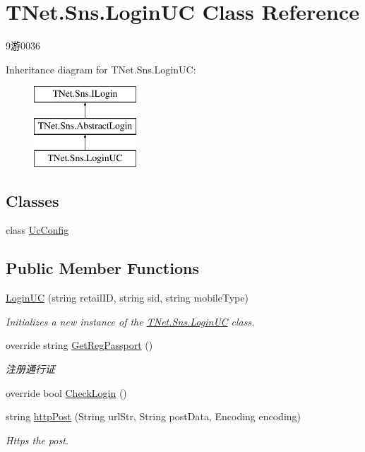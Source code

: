 \hypertarget{class_t_net_1_1_sns_1_1_login_u_c}{}\section{T\+Net.\+Sns.\+Login\+UC Class Reference}
\label{class_t_net_1_1_sns_1_1_login_u_c}


9游0036  


Inheritance diagram for T\+Net.\+Sns.\+Login\+UC\+:\begin{figure}[H]
\begin{center}
\leavevmode
\includegraphics[height=3.000000cm]{class_t_net_1_1_sns_1_1_login_u_c}
\end{center}
\end{figure}
\subsection*{Classes}
\begin{DoxyCompactItemize}
\item 
class \mbox{\hyperlink{class_t_net_1_1_sns_1_1_login_u_c_1_1_uc_config}{Uc\+Config}}
\end{DoxyCompactItemize}
\subsection*{Public Member Functions}
\begin{DoxyCompactItemize}
\item 
\mbox{\hyperlink{class_t_net_1_1_sns_1_1_login_u_c_a965c54ccbe5fb8ebfb912445912fa7d7}{Login\+UC}} (string retail\+ID, string sid, string mobile\+Type)
\begin{DoxyCompactList}\small\item\em Initializes a new instance of the \mbox{\hyperlink{class_t_net_1_1_sns_1_1_login_u_c}{T\+Net.\+Sns.\+Login\+UC}} class. \end{DoxyCompactList}\item 
override string \mbox{\hyperlink{class_t_net_1_1_sns_1_1_login_u_c_a6ba22f5ef4dbee94a5f59020d79f4b58}{Get\+Reg\+Passport}} ()
\begin{DoxyCompactList}\small\item\em 注册通行证 \end{DoxyCompactList}\item 
override bool \mbox{\hyperlink{class_t_net_1_1_sns_1_1_login_u_c_a1b22d8f5a48d7f62243e6cce124535ea}{Check\+Login}} ()
\item 
string \mbox{\hyperlink{class_t_net_1_1_sns_1_1_login_u_c_aa485488cbd33676d08c1a72c0a681abc}{http\+Post}} (String url\+Str, String post\+Data, Encoding encoding)
\begin{DoxyCompactList}\small\item\em Https the post. \end{DoxyCompactList}\end{DoxyCompactItemize}
